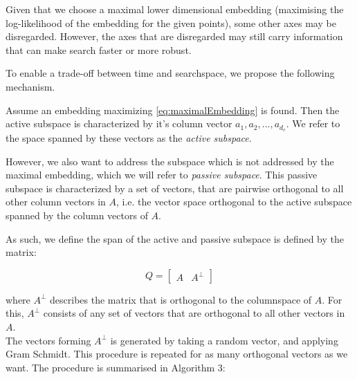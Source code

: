 Given that we choose a maximal lower dimensional embedding (maximising the log-likelihood of the embedding for the given points), some other axes may be disregarded.
However, the axes that are disregarded may still carry information that can make search faster or more robust.

To enable a trade-off between time and searchspace, we propose the following mechanism.


Assume an embedding maximizing \ref{eq:maximalEmbedding} is found.
Then the active subspace is characterized by it's column vector $  a_1, a_2, ..., a_{d_e} $.
We refer to the space spanned by these vectors as the \textit{active subspace}.

However, we also want to address the subspace which is not addressed by the maximal embedding, which we will refer to \textit{passive subspace}.
This passive subspace is characterized by a set of vectors, that are pairwise orthogonal to all other column vectors in $A$, i.e. the vector space orthogonal to the active subspace spanned by the column vectors of $A$.

As such, we define the span of the active and passive subspace is defined by the matrix:

\begin{equation}
Q = 
\begin{bmatrix}
A & A^\bot
\end{bmatrix}
\label{eq:entireSubspace}
\end{equation}

where $A^\bot$ describes the matrix that is orthogonal to the columnspace of $A$.
For this, $A^\bot$ consists of any set of vectors that are orthogonal to all other vectors in $A$.\\

The vectors forming $A^\bot$  is generated by taking a random vector, and applying Gram Schmidt.
This procedure is repeated for as many orthogonal vectors as we want. 
The procedure is summarised in Algorithm 3:\\


